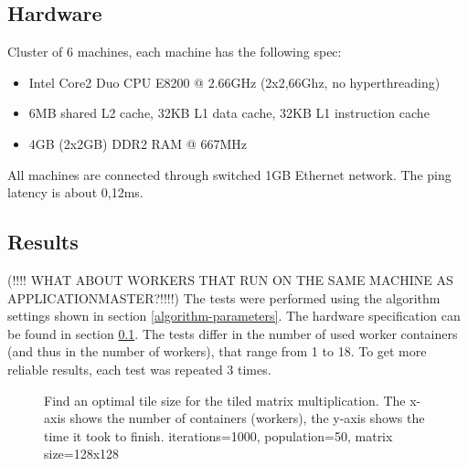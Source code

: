 \documentclass{article}
\begin{document}
\subsection{Hardware}
\label{hardware}
Cluster of 6 machines, each machine has the following spec:
\begin{itemize}
  \item Intel Core2 Duo CPU E8200 @ 2.66GHz (2x2,66Ghz, no hyperthreading)
  \item 6MB shared L2 cache, 32KB L1 data cache, 32KB L1 instruction cache
  \item 4GB (2x2GB) DDR2 RAM @ 667MHz
\end{itemize}
All machines are connected through switched 1GB Ethernet network. The ping latency is about 0,12ms.

\subsection{Results}
(!!!! WHAT ABOUT WORKERS THAT RUN ON THE SAME MACHINE AS APPLICATIONMASTER?!!!!)
The tests were performed using the algorithm settings shown in section \ref{algorithm-parameters}. The hardware specification can be found in section \ref{hardware}. The tests differ in the number of used worker containers (and thus in the number of workers), that range from 1 to 18. To get more reliable results, each test was repeated 3 times.

\begin{figure}[h]
  \centering
  \caption{Find an optimal tile size for the tiled matrix multiplication. The x-axis shows the number of containers (workers), the y-axis shows the time it took to finish. iterations=1000, population=50, matrix size=128x128}
\label{plot:tiledmul1}
\end{figure}
\end{document}
